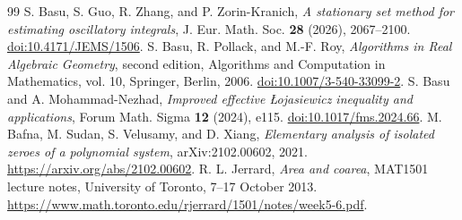 \documentclass[11pt]{amsart}
\theoremstyle{definition}
\theoremstyle{remark}
\numberwithin{equation}{section}
\begin{document}
\begin{thebibliography}{99}
 S. Basu, S. Guo, R. Zhang, and P. Zorin-Kranich, \emph{A stationary set method for estimating oscillatory integrals}, J. Eur. Math. Soc. \textbf{28} (2026), 2067--2100. \href{https://doi.org/10.4171/JEMS/1506}{doi:10.4171/JEMS/1506}.
 S. Basu, R. Pollack, and M.-F. Roy, \emph{Algorithms in Real Algebraic Geometry}, second edition, Algorithms and Computation in Mathematics, vol. 10, Springer, Berlin, 2006. \href{https://doi.org/10.1007/3-540-33099-2}{doi:10.1007/3-540-33099-2}.
 S. Basu and A. Mohammad-Nezhad, \emph{Improved effective {\L}ojasiewicz inequality and applications}, Forum Math. Sigma \textbf{12} (2024), e115. \href{https://doi.org/10.1017/fms.2024.66}{doi:10.1017/fms.2024.66}.
 M. Bafna, M. Sudan, S. Velusamy, and D. Xiang, \emph{Elementary analysis of isolated zeroes of a polynomial system}, arXiv:2102.00602, 2021. \url{https://arxiv.org/abs/2102.00602}.
 R. L. Jerrard, \emph{Area and coarea}, MAT1501 lecture notes, University of Toronto, 7--17 October 2013. \url{https://www.math.toronto.edu/rjerrard/1501/notes/week5-6.pdf}.


\end{thebibliography}
\end{document}
